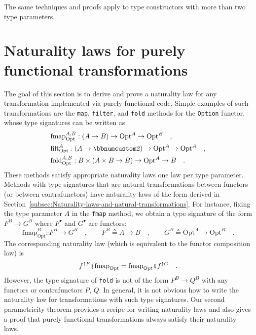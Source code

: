 The same techniques and proofs apply to type constructors with more
than two type parameters.

\section{Naturality laws for purely functional transformations\label{sec:Naturality-laws-for-fully-parametric-functions}}

The goal of this section is to derive and prove a naturality law for
any transformation implemented via purely functional code. Simple
examples of such transformations are the \lstinline!map!, \lstinline!filter!,
and \lstinline!fold! methods for the \lstinline!Option! functor,
whose type signatures can be written as
\begin{align*}
 & \text{fmap}_{\text{Opt}}^{A,B}:\left(A\rightarrow B\right)\rightarrow\text{Opt}^{A}\rightarrow\text{Opt}^{B}\quad,\\
 & \text{filt}_{\text{Opt}}^{A}:\left(A\rightarrow\bbnum 2\right)\rightarrow\text{Opt}^{A}\rightarrow\text{Opt}^{A}\quad,\\
 & \text{fold}_{\text{Opt}}^{A,B}:B\times\left(A\times B\rightarrow B\right)\rightarrow\text{Opt}^{A}\rightarrow B\quad.
\end{align*}
These methods satisfy appropriate naturality laws \textemdash{} one
law per type parameter. Methods with type signatures that are natural
transformations between functors (or between contrafunctors) have
naturality laws of the form derived in Section~\ref{subsec:Naturality-laws-and-natural-transformations}.
For instance, fixing the type parameter $A$ in the \lstinline!fmap!
method, we obtain a type signature of the form $F^{B}\rightarrow G^{B}$
where $F^{\bullet}$ and $G^{\bullet}$ are functors:
\[
\text{fmap}_{\text{Opt}}^{B}:F^{B}\rightarrow G^{B}\quad,\quad\quad F^{B}\triangleq A\rightarrow B\quad,\quad\quad G^{B}\triangleq\text{Opt}^{A}\rightarrow\text{Opt}^{B}\quad.
\]
The corresponding naturality law (which is equivalent to the functor
composition law) is
\[
f^{\uparrow F}\bef\text{fmap}_{\text{Opt}}=\text{fmap}_{\text{Opt}}\bef f^{\uparrow G}\quad.
\]
However, the type signature of \lstinline!fold! is not of the form
$P^{B}\rightarrow Q^{B}$ with any functors or contrafunctors $P$,
$Q$. In general, it is not obvious how to write the naturality law
for transformations with such type signatures. Our second parametricity
theorem provides a recipe for writing naturality laws and also gives
a proof that purely functional transformations always satisfy their
naturality laws.

